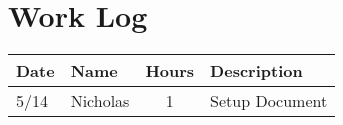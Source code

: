 \documentclass[letterpaper,10pt,fleqn,draftclsnofoot,onecolumn]{IEEEtran}
\begin{document}
	
	\section*{Work Log}
	\begin{tabular}{l l c p{1.1in}}\textbf{Date} & \textbf{Name} & \textbf{Hours} & \textbf{Description}\\\hline
		5/14 & Nicholas & 1 & Setup Document\\\hline
	\end{tabular}
		\nocite{*}
		
	
\end{document}
